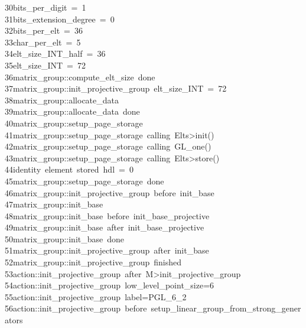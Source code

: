 \begin{tabbing}
30\>bits\_per\_digit\ =\ 1\\[0pt]
31\>bits\_extension\_degree\ =\ 0\\[0pt]
32\>bits\_per\_elt\ =\ 36\\[0pt]
33\>char\_per\_elt\ =\ 5\\[0pt]
34\>elt\_size\_INT\_half\ =\ 36\\[0pt]
35\>elt\_size\_INT\ =\ 72\\[0pt]
36\>matrix\_group::compute\_elt\_size\ done\\[0pt]
37\>matrix\_group::init\_projective\_group\ elt\_size\_INT\ =\ 72\\[0pt]
38\>matrix\_group::allocate\_data\\[0pt]
39\>matrix\_group::allocate\_data\ done\\[0pt]
40\>matrix\_group::setup\_page\_storage\\[0pt]
41\>matrix\_group::setup\_page\_storage\ calling\ Elts>init()\\[0pt]
42\>matrix\_group::setup\_page\_storage\ calling\ GL\_one()\\[0pt]
43\>matrix\_group::setup\_page\_storage\ calling\ Elts>store()\\[0pt]
44\>identity\ element\ stored\ hdl\ =\ 0\\[0pt]
45\>matrix\_group::setup\_page\_storage\ done\\[0pt]
46\>matrix\_group::init\_projective\_group\ before\ init\_base\\[0pt]
47\>matrix\_group::init\_base\\[0pt]
48\>matrix\_group::init\_base\ before\ init\_base\_projective\\[0pt]
49\>matrix\_group::init\_base\ after\ init\_base\_projective\\[0pt]
50\>matrix\_group::init\_base\ done\\[0pt]
51\>matrix\_group::init\_projective\_group\ after\ init\_base\\[0pt]
52\>matrix\_group::init\_projective\_group\ finished\\[0pt]
53\>action::init\_projective\_group\ after\ M>init\_projective\_group\\[0pt]
54\>action::init\_projective\_group\ low\_level\_point\_size=6\\[0pt]
55\>action::init\_projective\_group\ label=PGL\_6\_2\\[0pt]
56\>action::init\_projective\_group\ before\ setup\_linear\_group\_from\_strong\_generators\\[0pt]

\end{tabbing}
